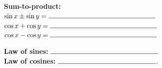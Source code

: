 \documentclass[10pt,paper=letter]{scrartcl}
\begin{document}
\begin{multicols}{2}
  \noindent\textbf{Sum-to-product:}\vspace{0.75em}\\
  $\sin x \pm \sin y = \rule{5.5cm}{0.15mm}$\vspace{0.75em}\\
  $\cos x + \cos y = \rule{5.5cm}{0.15mm}$\vspace{0.75em}\\
  $\cos x - \cos y = \rule{5.5cm}{0.15mm}$\vspace{1em}

 \noindent
  \textbf{Law of sines:} $\rule{5.5cm}{0.15mm}$\vspace{1em}\\
  \textbf{Law of cosines:} $\rule{5cm}{0.15mm}$.
\end{multicols}
\end{document}
